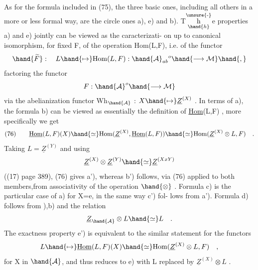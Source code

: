 
As for the formula included in (75), the three basic ones, including
all others in a more or less formal way, are the circle ones a), e) and
b). T\(\overset{\unsure{\text{-}}}{\underset{\hand{h}}{\text{h}}}\)e properties a) and e) jointly can be viewed as the caracterizati-%
on up to canonical isomorphism, for fixed F, of the  operation
Hom(L,F), i.e. of the functor 
\[ \hand{\widetilde{F}} : \quad L \hand{\mapsto} \mathrm{Hom}(L,F) : \hand{\mathcal{A}}_{ab}{}^{o} \hand{\longrightarrow \mathcal{M}}\hand{,} \]
factoring the functor
\[ F : \hand{\mathcal{A}}^{o} \hand{\longrightarrow \mathcal{M}} \]
via the abelianization functor Wh$_{\hand{\mathcal{A}}}$ : $X \hand{\mapsto} \underline{Z}^{(X)}$ . In terms of a), the
formula b) can be viewed as essentially the definition of \underline{Hom}(L,F) , more
specifically we get
\[ (76) \qquad \underline{\mathrm{Hom}}(L,F)(X) \hand{\simeq} \mathrm{Hom}(\underline{Z}^{(X)},\underline{\mathrm{Hom}}(L,F)) \hand{\simeq} \mathrm{Hom}(\underline{Z}^{(X)}\otimes L,F) \quad . \]
Taking $L = \underline{Z}^{(Y)}$ and using
\[ \underline{Z}^{(X)} \otimes \underline{Z}^{(Y)} \hand{\simeq} \underline{Z}^{(XxY)} \]
((17) page 389), (76)  gives a'), whereas b') follows,
via (76) applied to both members,from associativity of the operation $\hand{\otimes}$ .
Formula c) is the particular case of a) for X=e, in the same way c') fol-%
lows from a'). Formula d) follows from ),b) and the relation
\[ \underline{Z}_{\hand{\mathcal{A}}} \otimes L \hand{\simeq} L \quad . \]
The exactness property e')  is equivalent to the similar  statement
for the functors
\[ L \hand{\mapsto} \underline{\mathrm{Hom}}(L,F)(X) \hand{\simeq} \mathrm{Hom}(\underline{Z}^{(X)}\otimes L,F) \quad , \]
for X in $\hand{\mathcal{A}}$, and thus reduces to e) with L replaced by $\underline{Z}^{(X)}\otimes L$ .

